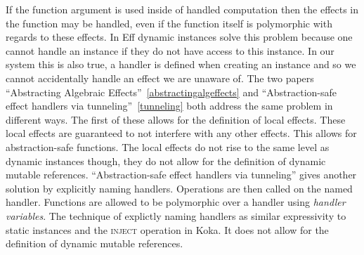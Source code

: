 If the function argument is used inside of handled computation then the effects in the function may be handled, even if the function itself is polymorphic with regards to these effects.
In Eff dynamic instances solve this problem because one cannot handle an instance if they do not have access to this instance.
In our system this is also true, a handler is defined when creating an instance and so we cannot accidentally handle an effect we are unaware of.
The two papers ``Abstracting Algebraic Effects''~\ref{abstractingalgeffects} and ``Abstraction-safe effect handlers via tunneling''~\ref{tunneling} both address the same problem in different ways.
The first of these allows for the definition of local effects.
These local effects are guaranteed to not interfere with any other effects.
This allows for abstraction-safe functions.
The local effects do not rise to the same level as dynamic instances though, they do not allow for the definition of dynamic mutable references.
``Abstraction-safe effect handlers via tunneling'' gives another solution by explicitly naming handlers.
Operations are then called on the named handler.
Functions are allowed to be polymorphic over a handler using \emph{handler variables}.
The technique of explictly naming handlers as similar expressivity to static instances and the \textsc{inject} operation in Koka.
It does not allow for the definition of dynamic mutable references.

